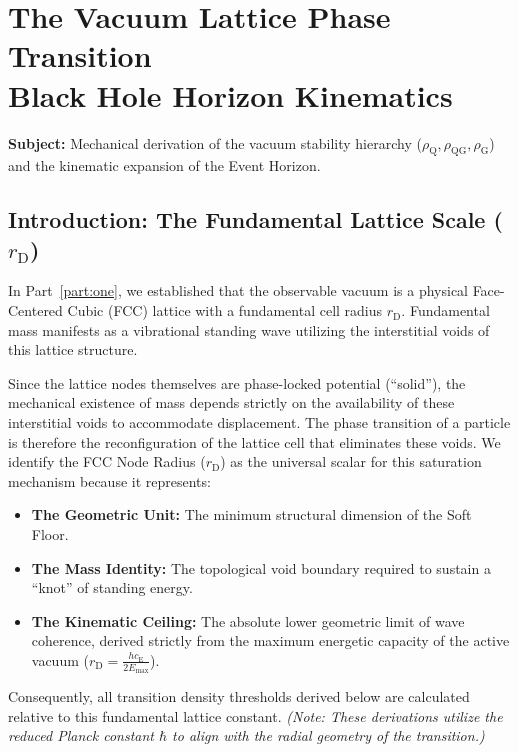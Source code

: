 \chapter[The Vacuum Lattice Phase Transition]{The Vacuum Lattice Phase Transition \\[0.2cm] \large Black Hole Horizon Kinematics}
\label{app:phase_transition}

\noindent\textbf{Subject:} Mechanical derivation of the vacuum stability hierarchy ($\rho_{\mathrm{Q}}, \rho_{\mathrm{QG}}, \rho_{\mathrm{G}}$) and the kinematic expansion of the Event Horizon.

\section{Introduction: The Fundamental Lattice Scale ($r_{\mathrm{D}}$)}
In Part~\ref{part:one}, we established that the observable vacuum is a physical Face-Centered Cubic (FCC) lattice with a fundamental cell radius $r_{\mathrm{D}}$. Fundamental mass manifests as a vibrational standing wave utilizing the interstitial voids of this lattice structure.

Since the lattice nodes themselves are phase-locked potential (``solid''), the mechanical existence of mass depends strictly on the availability of these interstitial voids to accommodate displacement. The phase transition of a particle is therefore the reconfiguration of the lattice cell that eliminates these voids. We identify the FCC Node Radius ($r_{\mathrm{D}}$) as the universal scalar for this saturation mechanism because it represents:
\begin{itemize}
    \item \textbf{The Geometric Unit:} The minimum structural dimension of the Soft Floor.
    \item \textbf{The Mass Identity:} The topological void boundary required to sustain a ``knot'' of standing energy.
    \item \textbf{The Kinematic Ceiling:} The absolute lower geometric limit of wave coherence, derived strictly from the maximum energetic capacity of the active vacuum ($r_{\mathrm{D}} = \frac{h c_{\mathrm{E}}}{2E_{\mathrm{max}}}$).
\end{itemize}

Consequently, all transition density thresholds derived below are calculated relative to this fundamental lattice constant. \textit{(Note: These derivations utilize the reduced Planck constant $\hbar$ to align with the radial geometry of the transition.)}

